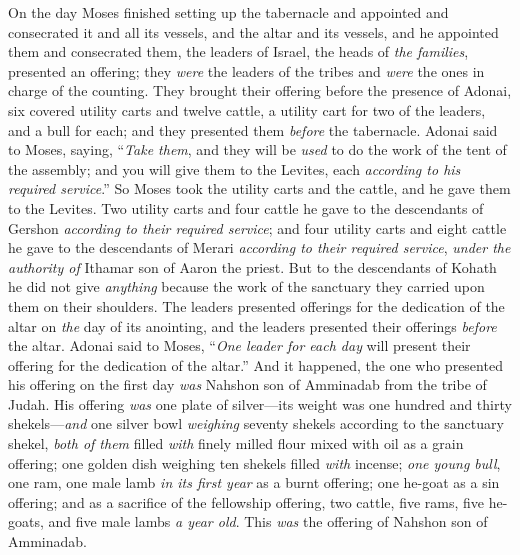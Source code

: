 \begin{biblechapter} %
 On the day Moses finished setting up the tabernacle and appointed and consecrated it and all its vessels, and the altar and its vessels, and he appointed them and consecrated them,
\verse the leaders of Israel, the heads of \textit{the families}, presented an offering; they \textit{were} the leaders of the tribes and \textit{were} the ones in charge of the counting.
\verse They brought their offering before the presence of Adonai, six covered utility carts and twelve cattle, a utility cart for two of the leaders, and a bull for each; and they presented them \textit{before} the tabernacle.
\verse Adonai said to Moses, saying,
\verse “\textit{Take them}, and they will be \textit{used} to do the work of the tent of the assembly; and you will give them to the Levites, each \textit{according to his required service}.”
\verse So Moses took the utility carts and the cattle, and he gave them to the Levites.
\verse Two utility carts and four cattle he gave to the descendants of Gershon \textit{according to their required service};
\verse and four utility carts and eight cattle he gave to the descendants of Merari \textit{according to their required service}, \textit{under the authority of} Ithamar son of Aaron the priest.
\verse But to the descendants of Kohath he did not give \textit{anything} because the work of the sanctuary they carried upon them on their shoulders.
\verse The leaders presented offerings for the dedication of the altar on \textit{the} day of its anointing, and the leaders presented their offerings \textit{before} the altar.
\verse Adonai said to Moses, “\textit{One leader for each day} will present their offering for the dedication of the altar.”
\verse And it happened, the one who presented his offering on the first day \textit{was} Nahshon son of Amminadab from the tribe of Judah.
\verse His offering \textit{was} one plate of silver—its weight was one hundred and thirty shekels—\textit{and} one silver bowl \textit{weighing} seventy shekels according to the sanctuary shekel, \textit{both of them} filled \textit{with} finely milled flour mixed with oil as a grain offering;
\verse one golden dish weighing ten shekels filled \textit{with} incense;
\verse \textit{one young bull}, one ram, one male lamb \textit{in its first year} as a burnt offering;
\verse one he-goat as a sin offering;
\verse and as a sacrifice of the fellowship offering, two cattle, five rams, five he-goats, and five male lambs \textit{a year old}. This \textit{was} the offering of Nahshon son of Amminadab.

\end{biblechapter}

